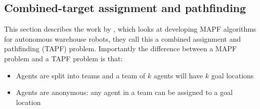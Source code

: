 \documentclass[a4paper,11pt]{article}
\begin{document}
%
%
%
%

%
%

\subsection{Combined-target assignment and pathfinding} \label{sec:tapf}
This section describes the work by \cite{ma2016optimal}, which looks at developing MAPF algorithms for autonomous warehouse robots, they call this a combined assignment and pathfinding (TAPF) problem. Importantly the difference between a MAPF problem and a TAPF problem is that:

\begin{itemize}
	\item Agents are split into teams and a team of $k$ agents will have $k$ goal locations
	\item Agents are anonymous: any agent in a team can be assigned to a goal location
\end{itemize}
\end{document}
